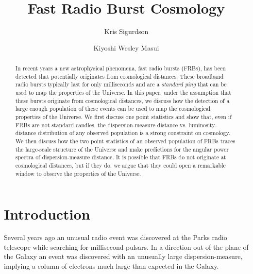 \documentclass[onecolumn,prd,noshowpacs,nofootinbib,amsmath,amssymb]{revtex4}
\begin{document}
\title{Fast Radio Burst Cosmology}

\author{Kris Sigurdson}

\author{Kiyoshi Wesley Masui}



\begin{abstract}
In recent years a new astrophysical phenomena, fast radio bursts (FRBs), has been detected that potentially originates from cosmological distances.  These broadband radio bursts  typically last for only milliseconds and are a \emph{standard ping} that can be used to map the properties of the Universe.  In this paper,  under the assumption that these bursts originate from cosmological distances, we discuss how the detection of a large enough population of these events can be used to map the cosmological properties of the Universe.    We first discuss one point statistics and show that, even if FRBs are not standard candles, the dispersion-measure distance vs. luminosity-distance distribution of any observed population is a strong constraint on cosmology.  We then discuss how the two point statistics of an observed population of FRBs traces the large-scale structure of the Universe and make predictions for the angular power spectra of dispersion-measure distance.  It is possible that FRBs do not originate at cosmological distances, but if they do, we argue that they could open a remarkable window to observe the properties of the Universe.
\end{abstract}

\maketitle

%
%

\section{Introduction}
Several years ago an unusual radio event was discovered at the Parks radio telescope while searching for millisecond pulsars.  In a direction out of the plane of the Galaxy an event was discovered with an unusually large dispersion-measure, implying a column of electrons much large than expected in the Galaxy.
\end{document}
